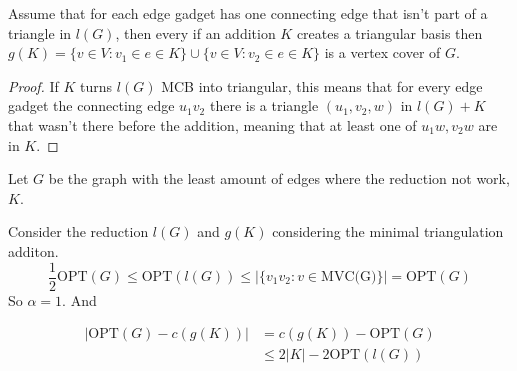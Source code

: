 \begin{lemma}
    Assume that for each edge gadget has one connecting edge that isn't part of a triangle in $l(G)$, then every if an addition $K$ creates a triangular basis then $g(K)=\{v\in V:v_1\in e\in K\}\cup \{v\in V:v_2\in e\in K\}$ is a vertex cover of $G$.
\end{lemma}
\begin{proof}
    If $K$ turns $l(G)$ MCB into triangular, this means that for every edge gadget the connecting edge $u_1v_2$ there is a triangle $(u_1,v_2,w)$ in $l(G)+K$ that wasn't there before the addition, meaning that at least one of $u_1w,v_2w$ are in $K$.
\end{proof}

Let $G$ be the graph with the least amount of edges where the reduction not work, $K$.


Consider the reduction $l(G)$ and $g(K)$ considering the minimal triangulation additon.
\[
\frac{1}{2}\text{OPT}(G)\leq\text{OPT}(l(G))\leq |\{v_1v_2:v\in \text{MVC(G)}\}|=\text{OPT}(G)
\]
So $\alpha = 1$.
And

\[
\begin{aligned}
    |\text{OPT}(G)-c(g(K))|&=
    c(g(K))-\text{OPT}(G)\\
    &\leq
    2|K|-2\text{OPT}(l(G))
\end{aligned}
\]